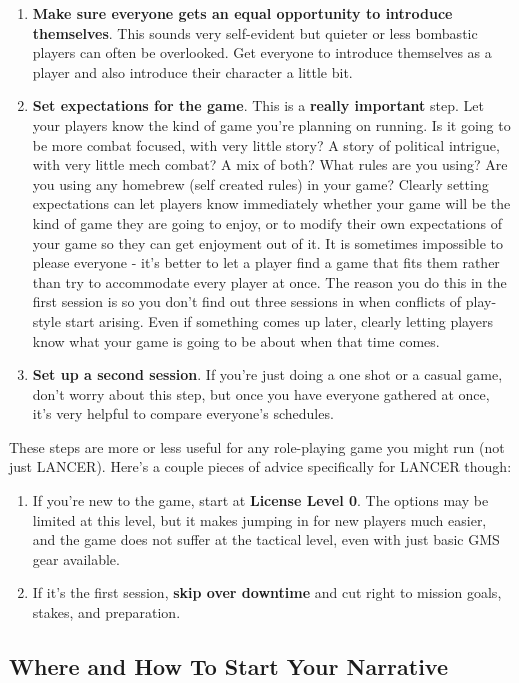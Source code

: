 \begin{enumerate}
\item \textbf{Make sure everyone gets an equal opportunity to introduce themselves}. This
sounds very self-evident but quieter or less bombastic players can often be
overlooked. Get everyone to introduce themselves as a player and also introduce
their character a little bit.
\item \textbf{Set expectations for the game}. This is a \textbf{really important} step. Let your players
know the kind of game you’re planning on running. Is it going to be more combat
focused, with very little story? A story of political intrigue, with very little mech
combat? A mix of both? What rules are you using? Are you using any homebrew
(self created rules) in your game? Clearly setting expectations can let players
know immediately whether your game will be the kind of game they are going to
enjoy, or to modify their own expectations of your game so they can get
enjoyment out of it. It is sometimes impossible to please everyone - it’s better to
let a player find a game that fits them rather than try to accommodate every player
at once. The reason you do this in the first session is so you don’t find out three
sessions in when conflicts of play-style start arising. Even if something comes up
later, clearly letting players know what your game is going to be about when that
time comes.
\item\textbf{Set up a second session}. If you’re just doing a one shot or a casual game, don’t
worry about this step, but once you have everyone gathered at once, it’s very
helpful to compare everyone’s schedules.
\end{enumerate}

These steps are more or less useful for any role-playing game you might run (not just LANCER).
Here’s a couple pieces of advice specifically for LANCER though:

\begin{enumerate}
\item If you’re new to the game, start at \textbf{License Level 0}. The options may be limited at this
level, but it makes jumping in for new players much easier, and the game does not suffer
at the tactical level, even with just basic GMS gear available.
\item If it’s the first session, \textbf{skip over downtime} and cut right to mission goals, stakes, and
preparation.
\end{enumerate}

\subsection{Where and How To Start Your Narrative}

